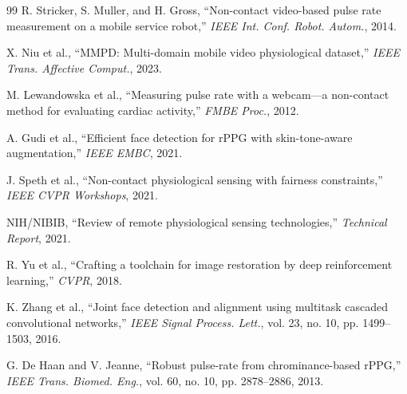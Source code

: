 \documentclass[conference]{IEEEtran}
\begin{document}
\begin{thebibliography}{99}
R. Stricker, S. Muller, and H. Gross, ``Non-contact video-based pulse rate measurement on a mobile service robot,'' \emph{IEEE Int. Conf. Robot. Autom.}, 2014.

X. Niu et al., ``MMPD: Multi-domain mobile video physiological dataset,'' \emph{IEEE Trans. Affective Comput.}, 2023.

M. Lewandowska et al., ``Measuring pulse rate with a webcam---a non-contact method for evaluating cardiac activity,'' \emph{FMBE Proc.}, 2012.

A. Gudi et al., ``Efficient face detection for rPPG with skin-tone-aware augmentation,'' \emph{IEEE EMBC}, 2021.

J. Speth et al., ``Non-contact physiological sensing with fairness constraints,'' \emph{IEEE CVPR Workshops}, 2021.

NIH/NIBIB, ``Review of remote physiological sensing technologies,'' \emph{Technical Report}, 2021.

R. Yu et al., ``Crafting a toolchain for image restoration by deep reinforcement learning,'' \emph{CVPR}, 2018.

K. Zhang et al., ``Joint face detection and alignment using multitask cascaded convolutional networks,'' \emph{IEEE Signal Process. Lett.}, vol. 23, no. 10, pp. 1499--1503, 2016.

G. De Haan and V. Jeanne, ``Robust pulse-rate from chrominance-based rPPG,'' \emph{IEEE Trans. Biomed. Eng.}, vol. 60, no. 10, pp. 2878--2886, 2013.

\end{thebibliography}
\end{document}
